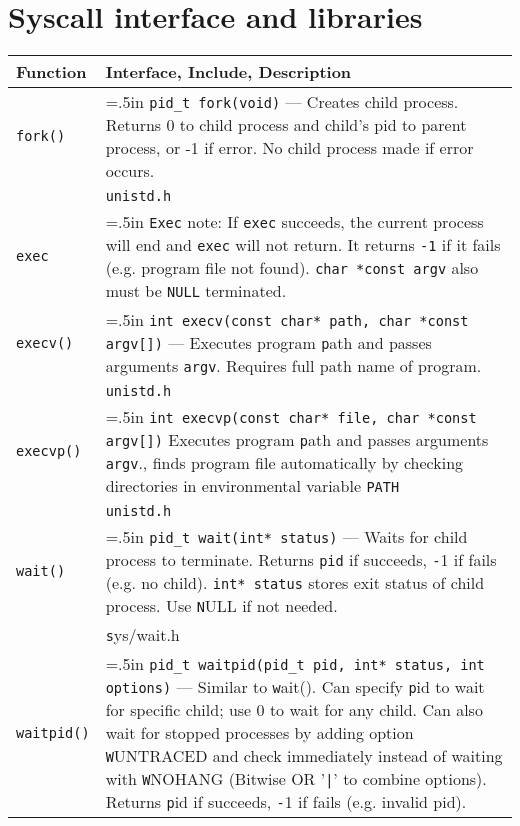 \documentclass{article}
\newcommand{\indenth}[1][.5]{\hangindent=#1in
                         \hangafter=1 }
\begin{document}
\section{Syscall interface and libraries}
\begin{longtabu}{p{1in}|p{5.7in}}
    \bf Function & \textbf{Interface, Include, Description}
        \\ \hline
    \texttt{fork()} &  \indenth\texttt{pid\_t fork(void)} --- Creates child process. Returns 0 to child process and child's pid to parent process, or -1 if error. No child process made if error occurs.
        \\
    & \texttt{unistd.h}
        \\ \hline
    \texttt{exec} & \indenth\texttt{Exec} note: If \texttt{exec} succeeds, the current process will end and \texttt{exec} will not return. It returns \texttt{-1} if it fails (e.g. program file not found). \texttt{char *const argv} also must be \texttt{NULL} terminated. \par
        \\
    \texttt{execv()} & \indenth\texttt{int execv(const char* path, char *const argv[])} --- Executes program \texttt path and passes arguments \texttt{argv}. Requires full path name of program.
        \\
    & \texttt{unistd.h}
        \\
    \texttt{execvp()} & \indenth\texttt{int execvp(const char* file, char *const argv[])} Executes program \texttt path and passes arguments \texttt{argv}., finds program file automatically by checking directories in environmental variable \texttt{PATH}
        \\
    & \texttt{unistd.h}
        \\ \hline
    \texttt{wait()} & \indenth\texttt{pid\_t wait(int* status)} --- Waits for child process to terminate. Returns \texttt{pid} if succeeds, \texttt -1 if fails (e.g. no child). \texttt{int* status} stores exit status of child process. Use \texttt NULL if not needed. 
        \\
    & \texttt sys/wait.h
        \\ \hline
    \texttt{waitpid()} & \indenth\texttt{pid\_t waitpid(pid\_t pid, int* status, int options)} --- Similar to \texttt wait(). Can specify \texttt pid to wait for specific child; use 0 to wait for any child. Can also wait for stopped processes by adding option \texttt WUNTRACED and check immediately instead of waiting with \texttt WNOHANG (Bitwise OR '\texttt{|}' to combine options). Returns \texttt pid if succeeds, \texttt -1 if fails (e.g. invalid pid).

\end{longtabu}
\end{document}
